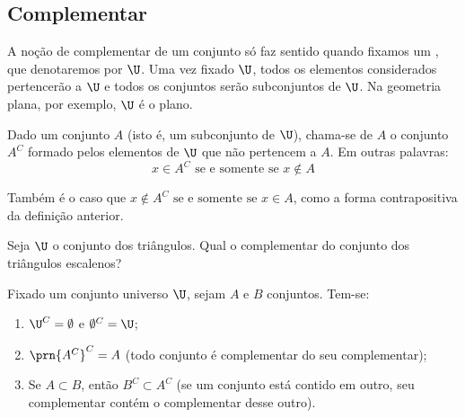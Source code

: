 \subsection{Complementar}
A noção de complementar de um conjunto só faz sentido quando fixamos um , que denotaremos por $\U$. Uma vez fixado $\U$, todos os elementos considerados pertencerão a $\U$ e todos os conjuntos serão subconjuntos de $\U$. Na geometria plana, por exemplo, $\U$ é o plano.

\begin{definition}[Complementar]
\label{def:complementar}
Dado um conjunto $A$ (isto é, um subconjunto de $\U$), chama-se  de $A$ o conjunto $A^C$ formado pelos elementos de $\U$ que não pertencem a $A$. Em outras palavras:
$$ x \in A^C \text{ se e somente se } x \notin A $$
\end{definition}

\begin{remark}
	Também é o caso que $ x \notin A^C \text{ se e somente se } x \in A $, como a forma contrapositiva da definição anterior.
\end{remark}

\begin{example}
Seja $\U$ o conjunto dos triângulos. Qual o complementar do conjunto dos triângulos escalenos?
\end{example}

\begin{proposition}
\label{prop-complementar}
Fixado um conjunto universo $\U$, sejam $A$ e $B$ conjuntos. Tem-se:
%
\begin{enumerate}
	\item $\U^C=\emptyset$ e $\emptyset^C = \U$;
	\item $\prn{A^C}^C=A$ (todo conjunto é complementar do seu complementar);
	\item Se $A \subset B$, então $B^C \subset A^C$ (se um conjunto está contido em outro, seu complementar contém o complementar desse outro). 
\end{enumerate}
\end{proposition}

